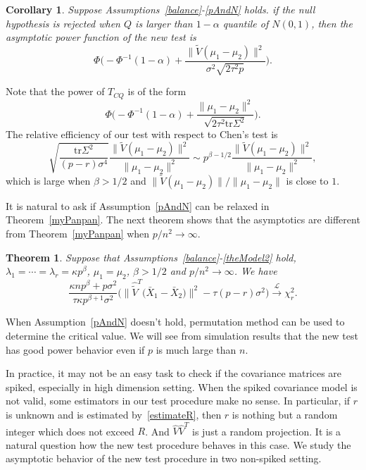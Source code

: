 \documentclass[review]{elsarticle}
\theoremstyle{plain}
\newtheorem{theorem}{\quad\quad Theorem}
\newtheorem{corollary}{\quad\quad Corollary}
\theoremstyle{definition}
\theoremstyle{remark}
\begin{document}
\begin{corollary}\label{testPowerh}
Suppose Assumptions~\ref{balance}-\ref{pAndN} holds.
    if the null hypothesis is rejected when $Q$ is larger than $1-\alpha$ quantile of $N(0,1)$, then the asymptotic power function of the new test is
    \begin{equation*}
        \Phi\Big(-\Phi^{-1}(1-\alpha)+\frac{\|\tilde{V}(\mu_1-\mu_2)\|^2}{\sigma^2\sqrt{2\tau^2p}}\Big).
    \end{equation*}
\end{corollary}


 Note that the power of $T_{CQ}$ is of the form
\begin{equation*}
    \Phi\Big(-\Phi^{-1}(1-\alpha)+\frac{\|\mu_1-\mu_2\|^2}{\sqrt{2\tau^2\mathrm{tr}\Sigma^2}}\Big).
\end{equation*}
 The relative efficiency of our test with respect to Chen's test is
\begin{equation*}
    \sqrt{\frac{\mathrm{tr}\Sigma^2}{(p-r)\sigma^4}}\frac{\|\tilde{V}(\mu_1-\mu_2)\|^2}{\|\mu_1-\mu_2\|^2}\sim p^{\beta-1/2}\frac{\|\tilde{V}(\mu_1-\mu_2)\|^2}{\|\mu_1-\mu_2\|^2},
\end{equation*}
which is large when $\beta>1/2$ and $\|\tilde{V}(\mu_1-\mu_2)\|/\|\mu_1-\mu_2\|$ is close to $1$.


It is natural to ask if Assumption~\ref{pAndN} can be relaxed in Theorem~\ref{myPanpan}.
The next theorem  shows that the asymptotics are different from Theorem~\ref{myPanpan} when $p/n^2\to \infty$.
\begin{theorem}\label{chilimthm}
    Suppose that Assumptions~\ref{balance}-\ref{theModel2} hold, $\lambda_1=\cdots=\lambda_r=\kappa p^{\beta}$,
    $\mu_1=\mu_2$, $\beta>1/2$ and $p/n^2\to \infty$. We have 
\begin{equation*}
\frac{\kappa n p^{\beta}+p\sigma^2}{\tau\kappa p^{\beta+1}\sigma^2}
        \big(
    \big\|\hat{\tilde{V}}^T\big(\bar{X}_1-\bar{X}_2\big)\big\|^2
        -\tau(p-r)\sigma^2\big)\xrightarrow{\mathcal{L}}\chi^2_r.
\end{equation*}
\end{theorem}
When Assumption~\ref{pAndN} doesn't hold,  permutation method can be used to determine the critical value.
We will see from simulation results that the new test has good power behavior even if $p$ is much large than $n$.



In practice, it may not be an easy task to check if the covariance matrices are spiked, especially in high dimension setting.
When the spiked covariance model is not valid,
some estimators in our test procedure make no sense.
In particular, if $r$ is unknown and is estimated by~\eqref{estimateR}, then $\hat{r}$ is nothing but a random integer which does not exceed $R$.
And $\hat{V}\hat{V}^T$ is just a random projection.
It is a natural question how the new test procedure behaves in this case.
We study the asymptotic behavior of the new test procedure in two non-spiked setting.
\end{document}
